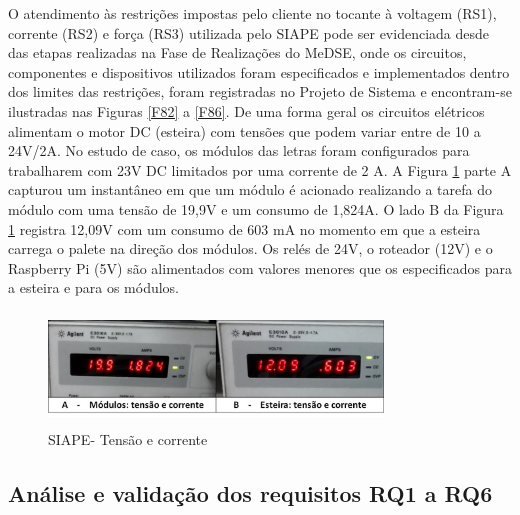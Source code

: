 \documentclass[10pt,letterpaper,twocolumn]{IEEEtran}
\begin{document}
O atendimento às restrições impostas pelo cliente no tocante à voltagem (RS1), corrente (RS2) e força (RS3) utilizada pelo SIAPE pode ser evidenciada desde das etapas realizadas na Fase de Realizações do MeDSE, onde os circuitos, componentes e dispositivos utilizados foram especificados e implementados dentro dos limites das restrições, foram registradas no Projeto de Sistema e encontram-se ilustradas nas Figuras \ref{F82} a \ref{F86}. De uma forma geral os circuitos elétricos alimentam o motor DC (esteira) com tensões que podem variar entre de 10 a 24V/2A. No estudo de caso, os módulos das letras foram configurados para trabalharem com 23V DC limitados por uma corrente de 2 A. A Figura \ref{F126} parte A capturou um instantâneo em que um módulo é acionado realizando a tarefa do módulo com uma tensão de 19,9V e um consumo de 1,824A.  O lado B da Figura \ref{F126} registra 12,09V com um consumo de 603 mA no momento em que a esteira carrega o palete na direção dos módulos. Os relés de 24V, o roteador (12V) e o Raspberry Pi (5V) são alimentados com valores menores que os especificados para a esteira e para os módulos. 

\begin{figure}[!h]
	\centering
	\includegraphics[width=8.9cm, height=3cm]{MeDSE_imagens/F126_SIAPE_TENSAO_CORRENTE.jpg} 
	\caption{SIAPE- Tensão e corrente}
	\label{F126}
\end{figure}

\subsection{Análise e validação dos requisitos RQ1 a RQ6}	
\end{document}

